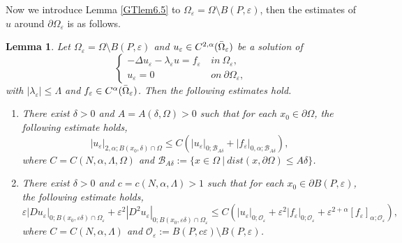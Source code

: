 \documentclass[11pt,reqno]{article}
\newtheorem{lemma}[teo]{Lemma}
\numberwithin{equation}{section}
\newcommand\e\varepsilon
\renewcommand\O\Omega
\begin{document}
 
Now we introduce Lemma \ref{GTlem6.5} to $\O_\e=\O\setminus B(P,\e)$, then the estimates of $u$ around $\partial \O_\e$ is as follows.
\begin{lemma}\label{FurGT}
    Let $\O_\e=\O\setminus B(P,\e)$ and $u_\e\in C^{2,\alpha}(\Bar{\O}_\e) $ be a solution of 
    $$\begin{cases}
        -\Delta u_\e-\lambda_\e u=f_\e \ &in\  \O_\e,\\
        u_\e=0 \  &on\  \partial\O_\e,
    \end{cases}$$
    with $|\lambda_\e|\leq \Lambda$  and  $f_\e\in C^\alpha(\Bar{\O}_\e)$. Then the following estimates hold. \begin{enumerate}
    \item[(i)]
    There exist $\delta>0$ and $A=A(\delta,\Omega)>0$ such that for each $x_0\in \partial\O$, the following estimate holds,
      \begin{equation}\label{eq0304-1}
      |u_\e|_{2,\alpha;B(x_0,\delta)\cap\O}\leq C(|u_\e|_{0;\mathcal{B}_{A\delta}}+|f_\e|_{0,\alpha;\mathcal{B}_{A\delta}}),
 \end{equation}
 where $C=C(N,\alpha,\Lambda,\O)$ and $\mathcal{B}_{A\delta}:=\{x\in\O\ |\ dist(x,\partial\O)\leq A\delta\}$.
  \item[(ii)]  
    There exist  $\delta>0$ and $c=c(N,\alpha,\Lambda)>1$ such that for each $x_0\in \partial B(P,\e)$, the following estimate holds,
    \begin{equation*}
         \e|Du_\e|_{0;B(x_0,\e\delta)\cap \O_\e }+\e^2|D^2u_\e|_{0;B(x_0,\e\delta)\cap \O_\e }\leq C(|u_\e|_{0;\mathcal{O}_\e}+\e^2|f_\e|_{0;\mathcal{O}_\e}+\e^{2+\alpha}[f_\e]_{\alpha;\mathcal{O}_\e}),
    \end{equation*}
    where $C=C(N,\alpha,\Lambda)$ and $\mathcal{O}_\e:=B(P,c\e)\setminus B(P,\e)$.
    \end{enumerate}
\end{lemma}
\end{document}
